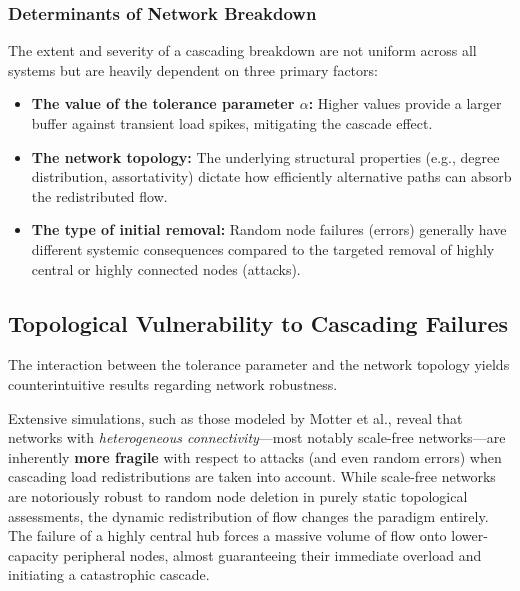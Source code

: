 \subsubsection{Determinants of Network Breakdown}
\label{subsubsec:breakdown_determinants}

The extent and severity of a cascading breakdown are not uniform across all systems but are heavily dependent on three primary factors:
\begin{itemize}
    \item \textbf{The value of the tolerance parameter \(\alpha\):} Higher values provide a larger buffer against transient load spikes, mitigating the cascade effect.
    \item \textbf{The network topology:} The underlying structural properties (e.g., degree distribution, assortativity) dictate how efficiently alternative paths can absorb the redistributed flow.
    \item \textbf{The type of initial removal:} Random node failures (errors) generally have different systemic consequences compared to the targeted removal of highly central or highly connected nodes (attacks).
\end{itemize}

\subsection{Topological Vulnerability to Cascading Failures}
\label{subsec:topological_vulnerability}

The interaction between the tolerance parameter and the network topology yields counterintuitive results regarding network robustness.


Extensive simulations, such as those modeled by Motter et al., reveal that networks with \textit{heterogeneous connectivity}—most notably scale-free networks—are inherently \textbf{more fragile} with respect to attacks (and even random errors) when cascading load redistributions are taken into account. While scale-free networks are notoriously robust to random node deletion in purely static topological assessments, the dynamic redistribution of flow changes the paradigm entirely. The failure of a highly central hub forces a massive volume of flow onto lower-capacity peripheral nodes, almost guaranteeing their immediate overload and initiating a catastrophic cascade.

